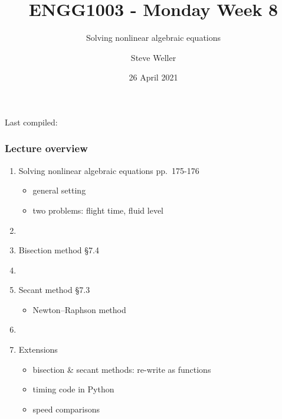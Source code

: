 \documentclass[english,14pt]{beamer}
\title{ENGG1003 - Monday Week 8}
\subtitle{Solving nonlinear algebraic equations }%
\author{Steve Weller}
\institute{University of Newcastle}
\date{26 April 2021}
\newcommand\red[1]{{\color{red} #1}}
\begin{document}
\begin{flushleft}
{\scriptsize Last compiled:~\DTMnow}
\vspace*{-5mm}
\end{flushleft}
\framebreak


\begin{frame}[fragile]

\frametitle{Lecture overview}
\begin{enumerate}
	\item Solving nonlinear algebraic equations \red{pp.~175-176}
	\begin{itemize}
		\item general setting
		\item two problems: flight time, fluid level
	\end{itemize}
	
	\item[]
	
	\item Bisection method \red{\S7.4}
	
	\item[]
	
	\item Secant method \red{\S7.3}
	\begin{itemize}
		\item Newton--Raphson method
	\end{itemize}
	
	\item[]
	
	\item Extensions
	\begin{itemize}
		\item bisection \& secant methods: re-write as functions
		\item timing code in Python
		\item speed comparisons
	\end{itemize}
	
\end{enumerate}

\end{frame}

\end{document}

